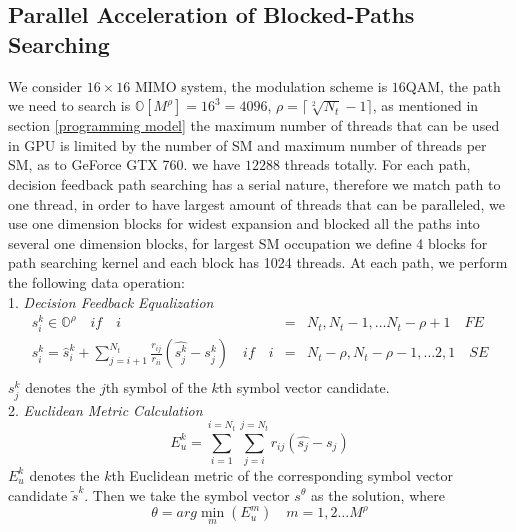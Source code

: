 \documentclass[12pt,a4paper,final]{article}
\begin{document}
\begin{spacing}{2.5}
\subsection{Parallel Acceleration of Blocked-Paths Searching}
  We consider $16\times 16$ MIMO system, the modulation scheme is $16$QAM, the path we need to search is $\mathbb{O}[M^{\rho}]=16^{3}=4096$, $\rho=\lceil \sqrt[2]{N_{t}}-1\rceil$, as mentioned in section \ref{programming model} the maximum number of threads that can be used in GPU is limited by the number of SM and maximum number of threads per SM, as to GeForce GTX 760. we have $12288$ threads totally.   For each path, decision feedback path searching has a serial nature, therefore we match path to one thread, in order to have largest amount of threads that can be paralleled, we use one dimension blocks for widest expansion and blocked all the paths into several one dimension blocks, for largest SM occupation we define 4 blocks for path searching kernel and each block has 1024 threads. At each path, we perform the following data operation:\\
1. \emph{Decision Feedback Equalization}\\
\begin{eqnarray}
\nonumber
{s}_{i}^{k}\in \mathbb{O}^{\rho}      \quad if\quad i&=&N_{t},N_{t}-1,\dots N_{t}-\rho+1\quad FE\\
\nonumber
{s}_{i}^{k}=\hat{s}_{i}^{k}+\sum_{j=i+1}^{N_{t}}\frac{r_{ij}}{r_{ii}}(\hat{s_{j}^{k}}-s_{j}^{k})\quad if\quad i &=& N_{t}-\rho,N_{t}-\rho-1,\dots 2,1\quad SE\\  \label{path searching}
\end{eqnarray}
$s_{j}^{k}$ denotes the $j$th symbol of the $k$th symbol vector candidate.\\
2. \emph{Euclidean Metric Calculation}\\
\begin{equation}
E_{u}^{k}=\sum_{i=1}^{i=N_{t}}\sum_{j=i}^{j=N_{t}}r_{ij}(\hat{s_{j}}-s_{j})\label{Eu metric}
\end{equation}
$E_{u}^{k}$ denotes the $k$th Euclidean metric of the corresponding symbol vector candidate $\widetilde{s}^{k}$. Then we take the symbol vector $s^{\theta}$ as the solution, where 
\begin{equation}
\theta=arg\min_{m}(E_{u}^{m})\quad m=1,2\dots M^{\rho} \label{Eu candidate}
\end{equation} 


\end{spacing}
\end{document}
